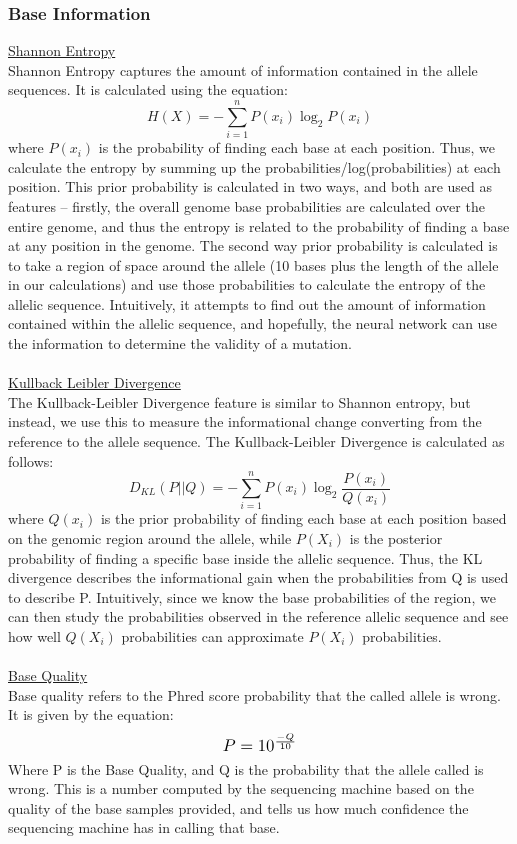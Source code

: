 \documentclass{article}
\begin{document}
\subsubsection{Base Information}
\underline{Shannon Entropy}\\
Shannon Entropy captures the amount of information contained in the allele sequences. It is calculated using the equation:
\begin{equation}
H(X) = -\sum_{i=1}^{n}P(x_i)\log_{2}P(x_i)
\end{equation}
where $P(x_i)$ is the probability of finding each base at each position. Thus, we calculate the entropy by summing up the probabilities/log(probabilities) at each position. This prior probability is calculated in two ways, and both are used as features -- firstly, the overall genome base probabilities are calculated over the entire genome, and thus the entropy is related to the probability of finding a base at any position in the genome. The second way prior probability is calculated is to take a region of space around the allele (10 bases plus the length of the allele in our calculations) and use those probabilities to calculate the entropy of the allelic sequence. Intuitively, it attempts to find out the amount of information contained within the allelic sequence, and hopefully, the neural network can use the information to determine the validity of a mutation.\\\\
\underline{Kullback Leibler Divergence}\\
The Kullback-Leibler Divergence feature is similar to Shannon entropy, but instead, we use this to measure the informational change converting from the reference to the allele sequence. The Kullback-Leibler Divergence is calculated as follows:
\begin{equation}
D_{KL}(P||Q) = -\sum_{i=1}^{n}P(x_i)\log_{2}{\frac{P(x_i)}{Q(x_i)}}
\end{equation}
where $Q(x_i)$ is the prior probability of finding each base at each position based on the genomic region around the allele, while $P(X_i)$ is the posterior probability of finding a specific base inside the allelic sequence. Thus, the KL divergence describes the informational gain when the probabilities from Q is used to describe P. Intuitively, since we know the base probabilities of the region, we can then study the probabilities observed in the reference allelic sequence and see how well $Q(X_i)$ probabilities can approximate $P(X_i)$ probabilities.\\\\
\underline{Base Quality}\\
Base quality refers to the Phred score probability that the called allele is wrong. It is given by the equation:
\[ \scalebox{1.2}{$P=10^{\frac{-Q}{10}}$} \]
Where P is the Base Quality, and Q is the probability that the allele called is wrong. This is a number computed by the sequencing machine based on the quality of the base samples provided, and tells us how much confidence the sequencing machine has in calling that base.\\\\
\end{document}
